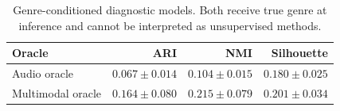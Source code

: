\begin{table}[htbp]
\centering
\caption{Genre-conditioned diagnostic models. Both receive true genre at inference and cannot be interpreted as unsupervised methods.}
\label{tab:oracle}
\small
\begin{tabular}{lrrr}
\toprule
Oracle & ARI & NMI & Silhouette \\
\midrule
Audio oracle & $0.067\pm0.014$ & $0.104\pm0.015$ & $0.180\pm0.025$ \\
Multimodal oracle & $0.164\pm0.080$ & $0.215\pm0.079$ & $0.201\pm0.034$ \\
\bottomrule
\end{tabular}
\end{table}

